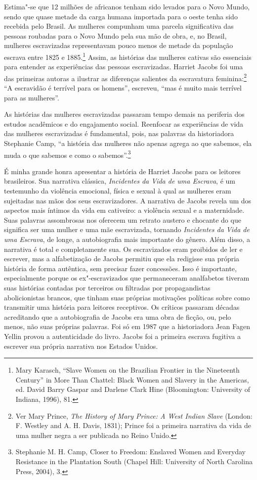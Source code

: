 Estima"-se que 12 milhões de africanos tenham sido levados para o Novo
Mundo, sendo que quase metade da carga humana importada para o oeste
tenha sido recebida pelo Brasil. As mulheres compunham uma parcela
significativa das pessoas roubadas para o Novo Mundo pela sua mão de
obra, e, no Brasil, mulheres escravizadas representavam
pouco menos de metade da população escrava entre 1825 e 1885.\footnote{Mary Karasch,
  ``Slave Women on the Brazilian Frontier in the Nineteenth Century'' in
  More Than Chattel: Black Women and Slavery in the Americas, ed. David
  Barry Gaspar and Darlene Clark Hine (Bloomington: University of
  Indiana, 1996), 81.} Assim, as histórias das mulheres cativas são
essenciais para entender as experiências das pessoas escravizadas.
Harriet Jacobs foi uma das primeiras autoras a ilustrar as diferenças
salientes da escravatura feminina:\footnote{Ver Mary Prince,
  \emph{The History of Mary Prince: A West Indian Slave} (London: F.
  Westley and A. H. Davis, 1831); Prince foi a primeira narrativa da
  vida de uma mulher negra a ser publicada no Reino Unido.} ``A
escravidão é terrível para os homens'', escreveu, ``mas é muito
mais terrível para as mulheres''.

As histórias das mulheres escravizadas
passaram tempo demais na periferia dos estudos acadêmicos e do
engajamento social. Reenfocar as experiências de vida das
mulheres escravizadas é fundamental, pois, nas palavras da historiadora
Stephanie Camp, ``a história das mulheres não apenas agrega ao que
sabemos, ela muda o que sabemos e como o sabemos''.\footnote{Stephanie
  M. H. Camp, Closer to Freedom: Enslaved Women and Everyday Resistance
  in the Plantation South (Chapel Hill: University of North Carolina
  Press, 2004), 3.}

É minha grande honra apresentar a história de Harriet Jacobs para os
leitores brasileiros. Sua narrativa clássica, \emph{Incidentes da Vida
de uma Escrava}, é um testemunho da violência emocional, física e sexual
à qual as mulheres eram sujeitadas nas mãos dos seus escravizadores. A
narrativa de Jacobs revela um dos aspectos mais íntimos da vida em
cativeiro: a violência sexual e a maternidade. Suas palavras assombrosas
nos oferecem um retrato austero e chocante do que significa ser uma
mulher e uma mãe escravizada, tornando \emph{Incidentes da Vida de uma Escrava},
de longe, a autobiografia mais importante do gênero. Além disso, a
narrativa é total e completamente sua. Os escravizados eram proibidos de
ler e escrever, mas a alfabetização de Jacobs permitiu que ela
redigisse sua própria história de forma autêntica, sem precisar fazer
concessões. Isso é importante, especialmente porque os ex"-escravizados que
permaneceram analfabetos tiveram suas histórias contadas por terceiros
ou filtradas por propagandistas abolicionistas brancos, que tinham suas
próprias motivações políticas sobre como transmitir uma história para
leitores receptivos. Os críticos passaram décadas acreditando que a
autobiografia de Jacobs era uma obra de ficção, ou, pelo menos, não suas
próprias palavras. Foi só em 1987 que a historiadora Jean Fagen Yellin
provou a autenticidade do livro. Jacobs foi a primeira escrava fugitiva
a escrever sua própria narrativa nos Estados Unidos.

